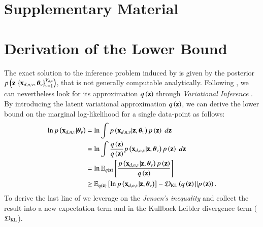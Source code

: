 \section*{Supplementary Material}
\label{sec:supmat}
\setcounter{section}{0}
\setcounter{figure}{0}
\setcounter{table}{0}
\setcounter{equation}{0}
\setcounter{algorithm}{0}
\renewcommand{\thesection}{S\arabic{section}}  
\renewcommand{\thefigure}{S\arabic{figure}}
\renewcommand{\thetable}{S\arabic{table}}  
\renewcommand{\theequation}{S\arabic{equation}}  
\renewcommand{\thealgorithm}{S\arabic{algorithm}}  

\section{Derivation of the Lower Bound}
\label{sm:lower_bound}

The exact solution to the inference problem induced by  is given by the posterior $p\left(\mathbf{z}|\left\{\mathbf{x}_{d,n,v},\boldsymbol{\theta}_v\right\}_{v=1}^{V_{d,n}}\right)$, that is not generally computable analytically.
Following \cite{Antelmi2019}, we can nevertheless look for its approximation $q\left(\mathbf{z}\right)$ through \textit{Variational Inference} \citep{Blei2017}.
By introducing the latent variational approximation $q\left(\mathbf{z}\right)$, we can derive the lower bound on the marginal log-likelihood for a single data-point as follows:
\begin{equation}\label{smeq:LB}  %
\begin{aligned}
\ln \p{\xdnv|\thetab_v} &= \ln \int \p{\xdnv|\z, \thetab_v} \p{\z} \; d\z \\
                        &= \ln \int \frac{\qz}{\qz} \p{\xdnv|\z, \thetab_v} \p{\z} \; d\z \\
                        &= \ln \EE{\qz}{\frac{\p{\xdnv|\z, \thetab_v} \p{\z}}{\qz}} \\
                        &\geq \EE{\qz}{\ln \p{\xdnv|\z, \thetab_v}} - \KL{\qz}{\pz}.
\end{aligned}
\end{equation}
To derive the last line of  we leverage on the \textit{Jensen's inequality} and collect the result into a new expectation term and in the Kullback-Leibler divergence term ($\operatorname{\mathcal{D}_{KL}}$).

